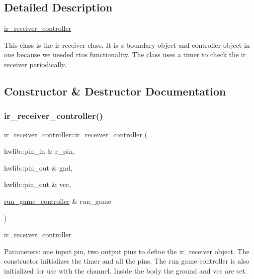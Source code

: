 \subsection{Detailed Description}
\hyperlink{classir__receiver__controller}{ir\+\_\+receiver\+\_\+controller} 

This class is the ir receiver class. It is a boundary object and controller object in one because we needed rtos functionality. The class uses a timer to check the ir receiver periodically. 

\subsection{Constructor \& Destructor Documentation}
\hypertarget{classir__receiver__controller_a8ef3a05bd1d4c8531e11d57af8519146}{}\label{classir__receiver__controller_a8ef3a05bd1d4c8531e11d57af8519146} 
\subsubsection{\texorpdfstring{ir\+\_\+receiver\+\_\+controller()}{ir\_receiver\_controller()}}
{\footnotesize\ttfamily ir\+\_\+receiver\+\_\+controller\+::ir\+\_\+receiver\+\_\+controller (\begin{DoxyParamCaption}\item[{hwlib\+::pin\+\_\+in \&}]{r\+\_\+pin,  }\item[{hwlib\+::pin\+\_\+out \&}]{gnd,  }\item[{hwlib\+::pin\+\_\+out \&}]{vcc,  }\item[{\hyperlink{classrun__game__controller}{run\+\_\+game\+\_\+controller} \&}]{run\+\_\+game }\end{DoxyParamCaption})\hspace{0.3cm}{\ttfamily [inline]}}



\hyperlink{classir__receiver__controller}{ir\+\_\+receiver\+\_\+controller} 

Parameters\+: one input pin, two output pins to define the ir\+\_\+receiver object. The constructor initializes the timer and all the pins. The run game controller is also initialized for use with the channel. Inside the body the ground and vcc are set. 


